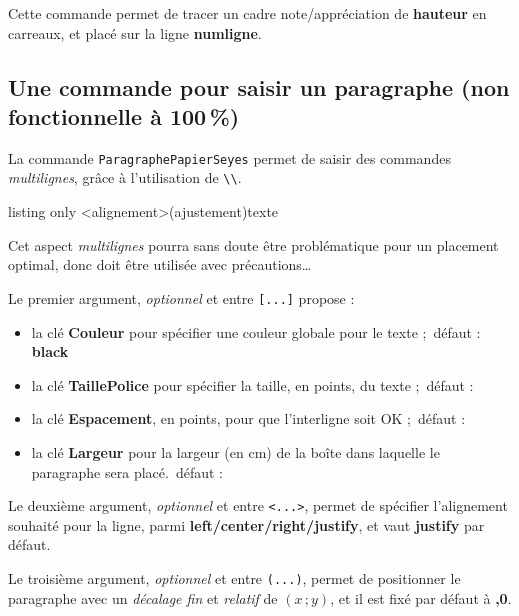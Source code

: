 \documentclass[a4paper]{article}
\newcommand\Cle[1]{{\bfseries\sffamily\textlangle #1\textrangle}}
\begin{document}
Cette commande permet de tracer un cadre \textsf{note/appréciation} de \Cle{hauteur} en carreaux, et placé sur la ligne \Cle{numligne}.

\pagebreak

\subsection{Une commande pour saisir un paragraphe (non fonctionnelle à 100\,\%)}

La commande \texttt{ParagraphePapierSeyes} permet de saisir des commandes \textit{multilignes}, grâce à l'utilisation de \texttt{\textbackslash\textbackslash}.

\begin{PresentationCode}{listing only}
\ParagraphePapierSeyes[options]<alignement>(ajustement){texte}
\end{PresentationCode}

\faBomb{} Cet aspect \textit{multilignes} pourra sans doute être problématique pour un placement optimal, donc doit être utilisée avec précautions\ldots

\smallskip

Le premier argument, \textit{optionnel} et entre \texttt{[...]} propose :

\begin{itemize}
	\item la clé \Cle{Couleur} pour spécifier une couleur globale pour le texte ;\hfill~défaut : \Cle{black}
	\item la clé \Cle{TaillePolice} pour spécifier la taille, en points, du texte ;\hfill~défaut : \Cle{1}
	\item la clé \Cle{Espacement}, en points, pour que l'interligne soit OK ;\hfill~défaut : \Cle{22.792}
	\item la clé \Cle{Largeur} pour la largeur (en cm) de la boîte dans laquelle le paragraphe sera placé.\hfill~défaut : \Cle{16.8}
\end{itemize}

Le deuxième argument, \textit{optionnel} et entre \texttt{<...>}, permet de spécifier l'alignement souhaité pour la ligne, parmi \Cle{left/center/right/justify}, et vaut \Cle{justify} par défaut.

\smallskip

Le troisième argument, \textit{optionnel} et entre \texttt{(...)}, permet de positionner le paragraphe avec un \textit{décalage fin} et \textit{relatif} de $(x\,;y)$, et il est fixé par défaut à \Cle{0,0}.
\end{document}
